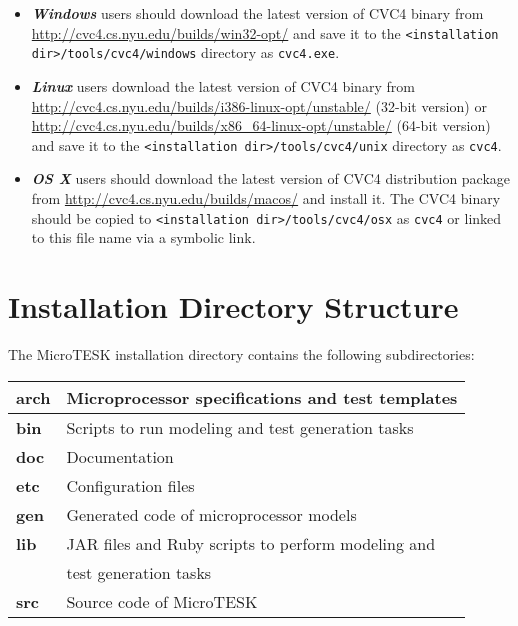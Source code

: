 \documentclass[oneside,final,12pt]{extreport}
\begin{document}
\begin{itemize}
\item \textbf{\textit{Windows}} users should download the latest version of CVC4 binary from
      \url{http://cvc4.cs.nyu.edu/builds/win32-opt/} and save it to the
      \texttt{<installation dir>/tools/cvc4/windows} directory as \texttt{cvc4.exe}.

\item \textbf{\textit{Linux}} users download the latest version of CVC4 binary from
      \url{http://cvc4.cs.nyu.edu/builds/i386-linux-opt/unstable/} (32-bit version) or
      \url{http://cvc4.cs.nyu.edu/builds/x86_64-linux-opt/unstable/} (64-bit version) and
      save it to the \texttt{<installation dir>/tools/cvc4/unix} directory as \texttt{cvc4}.

\item \textbf{\textit{OS X}} users should download the latest version of CVC4 distribution
      package from \url{http://cvc4.cs.nyu.edu/builds/macos/} and install it.
      The CVC4 binary should be copied to \texttt{<installation dir>/tools/cvc4/osx} as
      \texttt{cvc4} or linked to this file name via a symbolic link.

\end{itemize}

\section{Installation Directory Structure}

The MicroTESK installation directory contains the following subdirectories: \\

\begin{tabular}{ | l | l |}
  \hline
  \textbf{arch} & Microprocessor specifications and test templates \\ \hline
  \textbf{bin}  & Scripts to run modeling and test generation tasks \\ \hline
  \textbf{doc}  & Documentation \\ \hline
  \textbf{etc}  & Configuration files \\ \hline
  \textbf{gen}  & Generated code of microprocessor models \\ \hline
  \textbf{lib}  & JAR files and Ruby scripts to perform modeling and \\
  ~             & test generation tasks \\ \hline
  \textbf{src}  & Source code of MicroTESK \\ \hline
\end{tabular}
\end{document}
